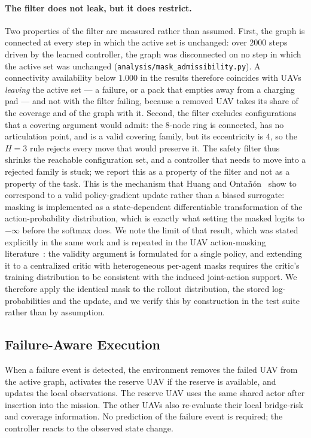 \documentclass[conference]{IEEEtran}
\newcommand{\tokEpisodeSteps}{2000}
\begin{document}
\paragraph{The filter does not leak, but it does restrict.} Two properties of the
filter are measured rather than assumed.  First, the graph is connected at
every step in which the active set is unchanged: over $\tokEpisodeSteps$ steps
driven by the learned controller, the graph was disconnected on no step in
which the active set was unchanged
(\texttt{analysis/mask\_admissibility.py}).  A connectivity availability
below $1.000$ in the results therefore coincides with UAVs \emph{leaving}
the active set --- a failure, or a pack that empties away from a charging
pad --- and not with the filter failing, because a removed UAV takes its
share of the coverage and of the graph with it.  Second, the filter
excludes configurations that a covering argument would admit: the
$8$-node ring is connected, has no articulation point, and is a valid
covering family, but its eccentricity is $4$, so the $H=3$ rule rejects
every move that would preserve it.  The safety filter thus shrinks the
reachable configuration set, and a controller that needs to move into a
rejected family is stuck; we report this as a property of the filter and
not as a property of the task. This is the mechanism that Huang and Onta\~n\'on~\cite{huang2022} show to correspond to a valid policy-gradient update rather than a biased surrogate: masking is implemented as a state-dependent differentiable transformation of the action-probability distribution, which is exactly what setting the masked logits to $-\infty$ before the softmax does. We note the limit of that result, which was stated explicitly in the same work and is repeated in the UAV action-masking literature~\cite{rizvi2025}: the validity argument is formulated for a single policy, and extending it to a centralized critic with heterogeneous per-agent masks requires the critic's training distribution to be consistent with the induced joint-action support. We therefore apply the identical mask to the rollout distribution, the stored log-probabilities and the update, and we verify this by construction in the test suite rather than by assumption.

\subsection{Failure-Aware Execution}
When a failure event is detected, the environment removes the failed UAV from the active graph, activates the reserve UAV if the reserve is available, and updates the local observations. The reserve UAV uses the same shared actor after insertion into the mission. The other UAVs also re-evaluate their local bridge-risk and coverage information. No prediction of the failure event is required; the controller reacts to the observed state change.
\end{document}

